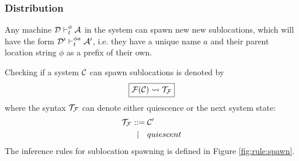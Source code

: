 \subsubsection{Distribution}

Any machine $\mathcal{D} \vdash_t^\phi \mathcal{A}$ in the system can spawn new new sublocations,
which will have the form $\mathcal{D}' \vdash_t^{\phi a} \mathcal{A}'$, i.e. they have a unique
name $a$ and their parent location string $\phi$ as a prefix of their own.

Checking if a system $\mathcal{C}$ can spawn sublocations is denoted by
\begin{equation*}
\boxed{\mathcal{F}(\mathcal{C}) \leadsto \mathcal{T}_{\mathcal{F}}}
\end{equation*}
where the syntax $\mathcal{T}_{\mathcal{F}}$ can denote either quiescence or the next system state:
\begin{align*}
 \mathcal{T}_{\mathcal{F}} ::={}& \mathcal{C}' \\
    |\quad{}& quiescent
\end{align*}
The inference rules for sublocation spawning is defined in Figure
\ref{fig:rule:spawn}.

